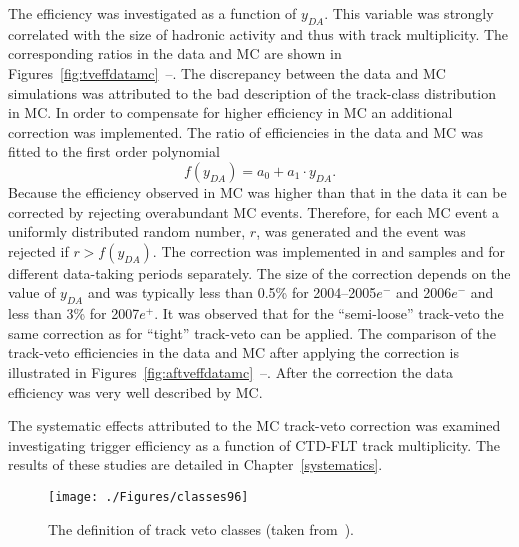 The efficiency was investigated as a function of $y_{DA}$. This variable was strongly correlated with the size of hadronic activity and thus with track multiplicity. The corresponding ratios in the data and MC are shown in Figures~\ref{fig:tveffdatamc}~--. The discrepancy between the data and MC simulations was attributed to the bad description of the track-class distribution in MC. In order to compensate for higher efficiency in MC an additional correction was implemented. The ratio of efficiencies in the data and MC was fitted to the first order polynomial
\begin{equation} 
 f\left(y_{DA}\right)=a_0 + a_1 \cdot y_{DA}.
\end{equation}
Because the efficiency observed in MC was higher than that in the data it can be corrected by rejecting overabundant MC events. Therefore, for each MC event a uniformly distributed random number, $r$, was generated and the event was rejected if $r > f\left(y_{DA}\right)$. The correction was implemented in \lepto and \ariadne samples and for different data-taking periods separately. The size of the correction depends on the value of $y_{DA}$ and was typically less than 0.5\% for 2004--2005$e^-$ and 2006$e^-$ and less than 3\% for 2007$e^+$. It was observed that for the ``semi-loose'' track-veto the same correction as for ``tight'' track-veto can be applied. The comparison of the track-veto efficiencies in the data and MC after applying the correction is illustrated in Figures~\ref{fig:aftveffdatamc}~--. After the correction the data efficiency was very well described by MC. 

The systematic effects attributed to the MC track-veto correction was examined investigating trigger efficiency as a function of CTD-FLT track multiplicity. The results of these studies are detailed in Chapter~\ref{systematics}.
\begin{figure}[t]
  \begin{center}
    \texttt{[image: ./Figures/classes96]}
  \end{center}
  \caption{The definition of track veto classes (taken from~\cite{Yamazaki site}).}
  \label{fig:trackvetodefinition}
\end{figure}

